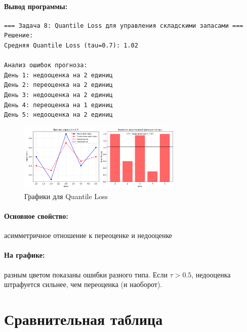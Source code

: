 \paragraph{Вывод программы:}
\begin{verbatim}
=== Задача 8: Quantile Loss для управления складскими запасами ===
Решение:
Средняя Quantile Loss (tau=0.7): 1.02

Анализ ошибок прогноза:
День 1: недооценка на 2 единиц
День 2: переоценка на 2 единиц
День 3: недооценка на 2 единиц
День 4: переоценка на 1 единиц
День 5: недооценка на 2 единиц
\end{verbatim}

\begin{figure}[h!]
    \centering
    \includegraphics[width=0.7\textwidth]{chapters/general/imgs/quantile.png}
    \caption{Графики для Quantile Loss}
\end{figure}

\paragraph{Основное свойство:} асимметричное отношение к переоценке и недооценке

\paragraph{На графике:} разным цветом показаны ошибки разного типа. Если $\tau > 0.5$, недооценка штрафуется сильнее, чем переоценка (и наоборот).


\section{Сравнительная таблица}

